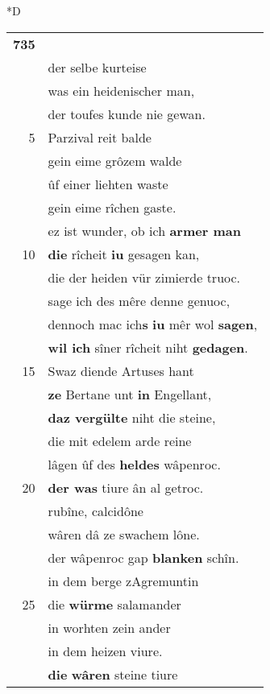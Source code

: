 \documentclass[8pt,a4paper,notitlepage]{article}
\begin{document}
\begin{table}[ht]
\begin{minipage}[t]{0.5\linewidth}
\small
\begin{center}*D
\end{center}
\begin{tabular}{rl}
\textbf{735} & \textit{\begin{large}Û\end{large}}f sîner unverzagten reise.\\ 
 & der selbe kurteise\\ 
 & was ein heidenischer man,\\ 
 & der toufes kunde nie gewan.\\ 
5 & Parzival reit balde\\ 
 & gein eime grôzem walde\\ 
 & ûf einer liehten waste\\ 
 & gein eime rîchen gaste.\\ 
 & ez ist wunder, ob ich \textbf{armer man}\\ 
10 & \textbf{die} rîcheit \textbf{iu} gesagen kan,\\ 
 & die der heiden vür zimierde truoc.\\ 
 & sage ich des mêre denne genuoc,\\ 
 & dennoch mac ich\textbf{s} \textbf{iu} mêr wol \textbf{sagen},\\ 
 & \textbf{wil ich} sîner rîcheit niht \textbf{gedagen}.\\ 
15 & Swaz diende Artuses hant\\ 
 & \textbf{ze} Bertane unt \textbf{in} Engellant,\\ 
 & \textbf{daz vergülte} niht die steine,\\ 
 & die mit edelem arde reine\\ 
 & lâgen ûf des \textbf{heldes} wâpenroc.\\ 
20 & \textbf{der was} tiure ân al getroc.\\ 
 & rubîne, calcidône\\ 
 & wâren dâ ze swachem lône.\\ 
 & der wâpenroc gap \textbf{blanken} schîn.\\ 
 & in dem berge zAgremuntin\\ 
25 & die \textbf{würme} salamander\\ 
 & in worhten zein ander\\ 
 & in dem heizen viure.\\ 
 & \textbf{die} \textbf{wâren} steine tiure\\ 

\end{tabular}
\end{minipage}
\end{table}
\end{document}
